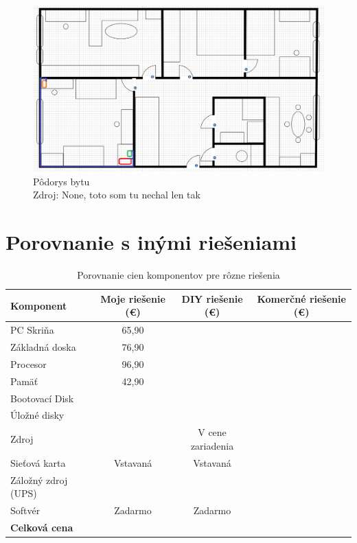 \documentclass[12pt,oneside,slovak,a4paper]{article}
\begin{document}
\begin{figure}[H]
	\centering
	\captionsetup{justification=centering,margin=2cm}
	\includegraphics[width=\linewidth]{./images/nakres-bytu.png}
	\centering
	\caption{Pôdorys bytu \\ Zdroj: None, toto som tu nechal len tak}
	\label{fig:floorplan}
\end{figure}

\section{Porovnanie s inými riešeniami}
\begin{table}[h]
\centering
\begin{tabular}{|l|c|c|c|}
\hline
\textbf{Komponent} & \textbf{Moje riešenie (€)} & \textbf{DIY riešenie (€)} & \textbf{Komerčné riešenie (€)} \\ \hline
PC Skriňa & 65,90 &  &  \\ \hline
Základná doska & 76,90 &  &  \\ \hline
Procesor & 96,90 &  &  \\ \hline
Pamäť & 42,90 &  &  \\ \hline
Bootovací Disk &  &  &  \\ \hline
Úložné disky &  &  &  \\ \hline
Zdroj &  & V cene zariadenia &  \\ \hline
Sieťová karta & Vstavaná & Vstavaná &  \\ \hline
Záložný zdroj (UPS) &  &  &  \\ \hline
Softvér & Zadarmo & Zadarmo &  \\ \hline
\textbf{Celková cena} &  &  &  \\ \hline
\end{tabular}
\caption{Porovnanie cien komponentov pre rôzne riešenia}
\end{table}
\end{document}
